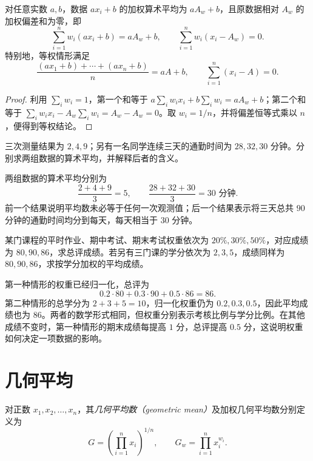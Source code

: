 \documentclass[UTF8,12pt,a4paper,fontset=fandol]{ctexart}
\begin{document}
\begin{proposition}
对任意实数 $a,b$，数据 $ax_i+b$ 的加权算术平均为 $aA_w+b$，且原数据相对 $A_w$ 的加权偏差和为零，即
\[
  \sum_{i=1}^n w_i(ax_i+b)=aA_w+b,
  \qquad \sum_{i=1}^n w_i(x_i-A_w)=0.
\]
特别地，等权情形满足
\[
  \frac{(ax_1+b)+\cdots+(ax_n+b)}{n}=aA+b,
  \qquad \sum_{i=1}^n(x_i-A)=0.
\]
\end{proposition}

\begin{proof}
利用 $\sum_iw_i=1$，第一个和等于 $a\sum_iw_ix_i+b\sum_iw_i=aA_w+b$；第二个和等于 $\sum_iw_ix_i-A_w\sum_iw_i=A_w-A_w=0$。取 $w_i=1/n$，并将偏差恒等式乘以 $n$，便得到等权结论。
\end{proof}

\begin{example}
三次测量结果为 $2,4,9$；另有一名同学连续三天的通勤时间为 $28,32,30$ 分钟。分别求两组数据的算术平均，并解释后者的含义。
\end{example}

\begin{solve}
两组数据的算术平均分别为
\[
  \frac{2+4+9}{3}=5,
  \qquad \frac{28+32+30}{3}=30\text{ 分钟}.
\]
前一个结果说明平均数未必等于任何一次观测值；后一个结果表示将三天总共 $90$ 分钟的通勤时间均分到每天，每天相当于 $30$ 分钟。
\end{solve}

\begin{example}
某门课程的平时作业、期中考试、期末考试权重依次为 $20\%,30\%,50\%$，对应成绩为 $80,90,86$，求总评成绩。若另有三门课的学分依次为 $2,3,5$，成绩同样为 $80,90,86$，求按学分加权的平均成绩。
\end{example}

\begin{solve}
第一种情形的权重已经归一化，总评为
\[
  0.2\cdot80+0.3\cdot90+0.5\cdot86=86.
\]
第二种情形的总学分为 $2+3+5=10$，归一化权重仍为 $0.2,0.3,0.5$，因此平均成绩也为 $86$。两者的数学形式相同，但权重分别表示考核比例与学分比例。在其他成绩不变时，第一种情形的期末成绩每提高 $1$ 分，总评提高 $0.5$ 分，这说明权重如何决定一项数据的影响。
\end{solve}

\section{几何平均}
\label{sec:means-geometric}

\begin{definition}
对正数 $x_1,x_2,\ldots,x_n$，其\emph{几何平均数（geometric mean）}及加权几何平均数分别定义为
\begin{equation}
\label{eq:means-geometric}
  G=\left(\prod_{i=1}^n x_i\right)^{1/n},
  \qquad G_w=\prod_{i=1}^n x_i^{w_i}.
\end{equation}
\end{definition}
\end{document}
